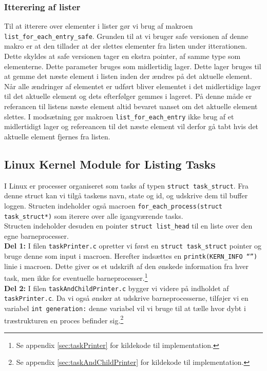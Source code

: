 \documentclass[main.tex]{subfile}
\begin{document}
\subsubsection*{Itterering af lister}
Til at itterere over elementer i lister gør vi brug af makroen \texttt{list\_for\_each\_entry\_safe}. Grunden til at vi bruger safe versionen af denne makro er at den tillader at der slettes elementer fra listen under itterationen. Dette skyldes at safe versionen tager en ekstra pointer, af samme type som elementerne. Dette parameter bruges som midlertidig lager. Dette lager bruges til at gemme det næste element i listen inden der ændres på det aktuelle element. Når alle ændringer af elementet er udført bliver elementet i det midlertidige lager til det aktuelle element og dets efterfølger gemmes i lageret. På denne måde er referancen til listens næste element altid bevaret uanset om det aktuelle element slettes. I modsætning gør makroen \texttt{list\_for\_each\_entry} ikke brug af et midlertidigt lager og refereancen til det næste element vil derfor gå tabt hvis det aktuelle element fjernes fra listen.

\subsection{Linux Kernel Module for Listing Tasks}
I Linux er processer organiseret som tasks af typen \texttt{struct task\_struct}. Fra denne struct kan vi tilgå taskens navn, state og id, og udskrive dem til buffer loggen. Structen indeholder også macroen \texttt{for\_each\_process(struct task\_struct*)} som iterere over alle igangværende tasks.\\

Structen indeholder desuden en pointer \texttt{struct list\_head} til en liste over den egne barneprocesser.\\

\textbf{Del 1:} I filen \texttt{taskPrinter.c} opretter vi først en \texttt{struct task\_struct} pointer og bruge denne som input i macroen. Herefter indsættes en \texttt{printk(KERN\_INFO “”)} linie i macroen. Dette giver os et udskrift af den ønskede information fra hver task, men ikke for eventuelle barneprocesser.\footnote{Se appendix \ref{sec:taskPrinter} for kildekode til implementation.}\\

\textbf{Del 2:} I filen \texttt{taskAndChildPrinter.c} bygger vi videre på indholdet af \texttt{taskPrinter.c}. Da vi også ønsker at udskrive barneprocesserne, tilføjer vi en variabel \texttt{int generation:} denne variabel vil vi bruge til at tælle hvor dybt i træstrukturen en proces befinder sig.\footnote{Se appendix \ref{sec:taskAndChildPrinter} for kildekode til implementation.}\\
\end{document}
